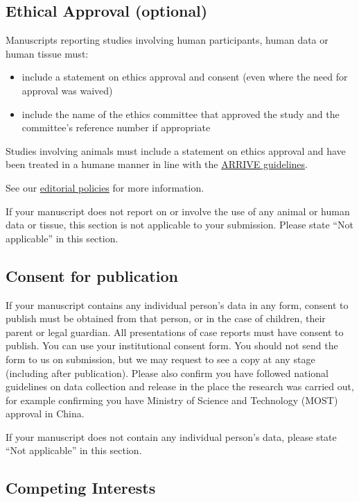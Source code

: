 \documentclass[a4paper,num-refs]{oup-contemporary}
\begin{document}
\subsection{Ethical Approval (optional)}
Manuscripts reporting studies involving human participants, human data or human tissue must:

\begin{itemize}
\item include a statement on ethics approval and consent (even where the need for approval was waived)
\item include the name of the ethics committee that approved the study and the committee's reference number if appropriate
\end{itemize}

Studies involving animals must include a statement on ethics approval and have been treated in a humane manner in line with the \href{http://www.nc3rs.org.uk/arrive-guidelines}{ARRIVE guidelines}.

See our \href{https://academic.oup.com/gigascience/pages/editorial_policies_and_reporting_standards}{editorial policies} for more information.

If your manuscript does not report on or involve the use of any animal or human data or tissue, this section is not applicable to your submission. Please state ``Not applicable'' in this section.

\subsection{Consent for publication}

If your manuscript contains any individual person's data in any form, consent to publish must be obtained from that person, or in the case of children, their parent or legal guardian. All presentations of case reports must have consent to publish. You can use your institutional consent form. You should not send the form to us on submission, but we may request to see a copy at any stage (including after publication). Please also confirm you have followed national guidelines on data collection and release in the place the research was carried out, for example confirming you have Ministry of Science and Technology (MOST) approval in China.

If your manuscript does not contain any individual person's data, please state ``Not applicable'' in this section.

\subsection{Competing Interests}
\end{document}
